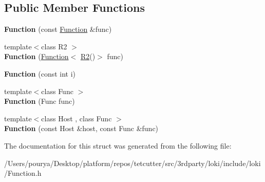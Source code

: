 \subsection*{Public Member Functions}
\begin{DoxyCompactItemize}
\item 
\hypertarget{structLoki_1_1Function_3_01R_07_08_4_a4fd5d720f1a8a3c36c8d89ff3dca72ce}{}{\bfseries Function} (const \hyperlink{structLoki_1_1Function}{Function} \&func)\label{structLoki_1_1Function_3_01R_07_08_4_a4fd5d720f1a8a3c36c8d89ff3dca72ce}

\item 
\hypertarget{structLoki_1_1Function_3_01R_07_08_4_a5e98cabf178635364a4df7cbf2037244}{}{\footnotesize template$<$class R2 $>$ }\\{\bfseries Function} (\hyperlink{structLoki_1_1Function}{Function}$<$ \hyperlink{structR2}{R2}()$>$ func)\label{structLoki_1_1Function_3_01R_07_08_4_a5e98cabf178635364a4df7cbf2037244}

\item 
\hypertarget{structLoki_1_1Function_3_01R_07_08_4_a1d066383809b915fe46b3d9e90f6b40c}{}{\bfseries Function} (const int i)\label{structLoki_1_1Function_3_01R_07_08_4_a1d066383809b915fe46b3d9e90f6b40c}

\item 
\hypertarget{structLoki_1_1Function_3_01R_07_08_4_abd74209a21fae1c11a095a5a5f5a3ef6}{}{\footnotesize template$<$class Func $>$ }\\{\bfseries Function} (Func func)\label{structLoki_1_1Function_3_01R_07_08_4_abd74209a21fae1c11a095a5a5f5a3ef6}

\item 
\hypertarget{structLoki_1_1Function_3_01R_07_08_4_ac9b8bfbaf5afb0524e6ec7a9f4060a4f}{}{\footnotesize template$<$class Host , class Func $>$ }\\{\bfseries Function} (const Host \&host, const Func \&func)\label{structLoki_1_1Function_3_01R_07_08_4_ac9b8bfbaf5afb0524e6ec7a9f4060a4f}

\end{DoxyCompactItemize}


The documentation for this struct was generated from the following file\+:\begin{DoxyCompactItemize}
\item 
/\+Users/pourya/\+Desktop/platform/repos/tetcutter/src/3rdparty/loki/include/loki/Function.\+h\end{DoxyCompactItemize}
